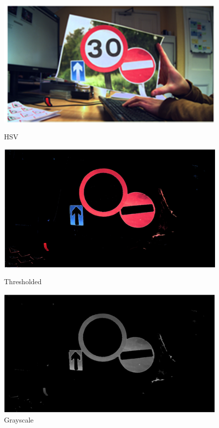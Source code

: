 \begin{figure}[H]
	\includegraphics[width=\linewidth]{images/zynq0.png}
	\caption{HSV}\label{fig:zynq0}
	\endminipage\hfill
	\includegraphics[width=\linewidth]{images/zynq1.png}
	\caption{Thresholded}\label{fig:zynq1}
	\endminipage\hfill
	\includegraphics[width=\linewidth]{images/zynq2.png}
	\caption{Grayscale}\label{fig:zynq2}

\end{figure}
